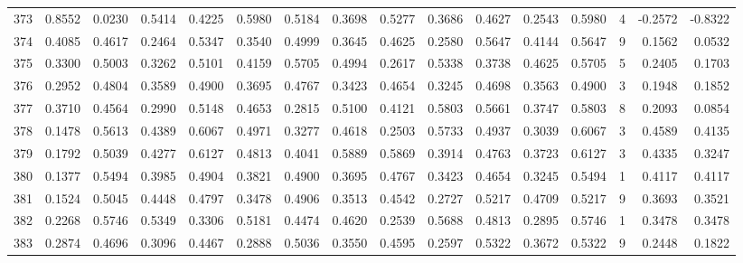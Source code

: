 \begin{tabular}{lrrrrrrrrrrrrrrr}
373 &      0.8552 &  0.0230 &  0.5414 &  0.4225 &  0.5980 &  0.5184 &  0.3698 &  0.5277 &  0.3686 &  0.4627 &   0.2543 &     0.5980 &      4 &                   -0.2572 &                    -0.8322 \\
374 &      0.4085 &  0.4617 &  0.2464 &  0.5347 &  0.3540 &  0.4999 &  0.3645 &  0.4625 &  0.2580 &  0.5647 &   0.4144 &     0.5647 &      9 &                    0.1562 &                     0.0532 \\
375 &      0.3300 &  0.5003 &  0.3262 &  0.5101 &  0.4159 &  0.5705 &  0.4994 &  0.2617 &  0.5338 &  0.3738 &   0.4625 &     0.5705 &      5 &                    0.2405 &                     0.1703 \\
376 &      0.2952 &  0.4804 &  0.3589 &  0.4900 &  0.3695 &  0.4767 &  0.3423 &  0.4654 &  0.3245 &  0.4698 &   0.3563 &     0.4900 &      3 &                    0.1948 &                     0.1852 \\
377 &      0.3710 &  0.4564 &  0.2990 &  0.5148 &  0.4653 &  0.2815 &  0.5100 &  0.4121 &  0.5803 &  0.5661 &   0.3747 &     0.5803 &      8 &                    0.2093 &                     0.0854 \\
378 &      0.1478 &  0.5613 &  0.4389 &  0.6067 &  0.4971 &  0.3277 &  0.4618 &  0.2503 &  0.5733 &  0.4937 &   0.3039 &     0.6067 &      3 &                    0.4589 &                     0.4135 \\
379 &      0.1792 &  0.5039 &  0.4277 &  0.6127 &  0.4813 &  0.4041 &  0.5889 &  0.5869 &  0.3914 &  0.4763 &   0.3723 &     0.6127 &      3 &                    0.4335 &                     0.3247 \\
380 &      0.1377 &  0.5494 &  0.3985 &  0.4904 &  0.3821 &  0.4900 &  0.3695 &  0.4767 &  0.3423 &  0.4654 &   0.3245 &     0.5494 &      1 &                    0.4117 &                     0.4117 \\
381 &      0.1524 &  0.5045 &  0.4448 &  0.4797 &  0.3478 &  0.4906 &  0.3513 &  0.4542 &  0.2727 &  0.5217 &   0.4709 &     0.5217 &      9 &                    0.3693 &                     0.3521 \\
382 &      0.2268 &  0.5746 &  0.5349 &  0.3306 &  0.5181 &  0.4474 &  0.4620 &  0.2539 &  0.5688 &  0.4813 &   0.2895 &     0.5746 &      1 &                    0.3478 &                     0.3478 \\
383 &      0.2874 &  0.4696 &  0.3096 &  0.4467 &  0.2888 &  0.5036 &  0.3550 &  0.4595 &  0.2597 &  0.5322 &   0.3672 &     0.5322 &      9 &                    0.2448 &                     0.1822 \\

\end{tabular}
